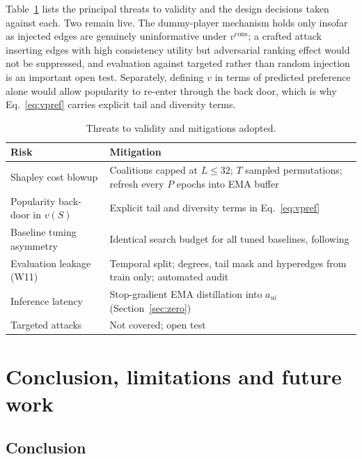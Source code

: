 \documentclass[final,5p,times,twocolumn]{elsarticle}
\begin{document}
Table~\ref{tab:risks} lists the principal threats to validity and the design
decisions taken against each. Two remain live. The dummy-player mechanism
holds only insofar as injected edges are genuinely uninformative under
$v^{\mathrm{cons}}$; a crafted attack inserting edges with high consistency
utility but adversarial ranking effect would not be suppressed, and evaluation
against targeted rather than random injection is an important open test.
Separately, defining $v$ in terms of predicted preference alone would allow
popularity to re-enter through the back door, which is why
Eq.~\eqref{eq:vpref} carries explicit tail and diversity terms.

\begin{table}[t]
\centering
\caption{Threats to validity and mitigations adopted.}
\label{tab:risks}
\footnotesize
\begin{tabular}{p{1.9cm}p{5.3cm}}
\toprule
\textbf{Risk} & \textbf{Mitigation} \\
\midrule
Shapley cost blowup & Coalitions capped at $L\le32$; $T$ sampled
permutations; refresh every $P$ epochs into EMA buffer \\
Popularity back-door in $v(S)$ & Explicit tail and diversity terms in
Eq.~\eqref{eq:vpref} \\
Baseline tuning asymmetry & Identical search budget for all tuned baselines,
following \citep{dacrema2019worrying} \\
Evaluation leakage (W11) & Temporal split; degrees, tail mask and hyperedges
from train only; automated audit \\
Inference latency & Stop-gradient EMA distillation into $a_{ui}$
(Section~\ref{sec:zero}) \\
Targeted attacks & Not covered; open test \\
\bottomrule
\end{tabular}
\end{table}

\section{Conclusion, limitations and future work}
\label{sec:conclusion}

\subsection{Conclusion}
\end{document}
